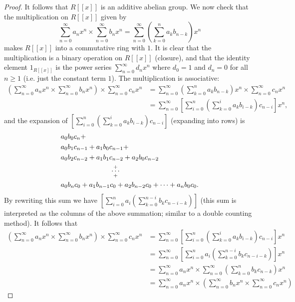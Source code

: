 \documentclass[11pt]{article}
\newcommand{\br}[1]{\left(#1\right)}
\newcommand{\sbr}[1]{\left[#1\right]}
\begin{document}
\begin{enumerate}
\begin{enumerate}
\begin{proof}
            It follows that $R[[x]]$ is an additive abelian group. 
            We now check that the multiplication on $R[[x]]$ given by \[\sum_{n=0}^\infty a_nx^n\times \sum_{n=0}^\infty b_nx^n = \sum_{n=0}^\infty\br{\sum_{k=0}^n a_kb_{n-k}}x^n\] makes $R[[x]]$ into a commutative ring with $1$. It is clear that the multiplication is a binary operation on $R[[x]]$ (closure), and that the identity element $1_{R[[x]]}$ is the power series $\sum_{n=0}^\infty d_nx^n$ where $d_0 = 1$ and $d_n = 0$ for all $n\geq 1$ (i.e. just the constant term $1$). 
            The multiplication is associative: \begin{align*}
                \br{\sum_{n=0}^\infty a_nx^n \times \sum_{n=0}^\infty b_nx^n} \times \sum_{n=0}^\infty c_nx^n &= \sum_{n=0}^\infty\br{\sum_{k=0}^n a_kb_{n-k}}x^n\times \sum_{n=0}^\infty c_nx^n \\
                &= \sum_{n=0}^{\infty}\sbr{\sum_{i=0}^n\br{\sum_{k=0}^i a_kb_{i-k}}c_{n-i}}x^n,
            \end{align*} and the expansion of $\sbr{\sum_{i=0}^n\br{\sum_{k=0}^i a_kb_{i-k}}c_{n-i}}$ (expanding into rows) is \begin{align*}
                &a_0b_0c_n +\\
                &a_0b_1c_{n-1} + a_1b_0c_{n-1} +\\
                &a_0b_2c_{n-2} + a_1b_1c_{n-2} + a_2b_0c_{n-2}  \\
                &\hspace{7.25em} \overset{+}{\underset{+}{\cdots}} \\
                &a_0b_nc_0 + a_1b_{n-1}c_0 + a_2b_{n-2}c_0 + \cdots + a_nb_0c_0.
            \end{align*}
            By rewriting this sum we have $\sbr{\sum_{i=0}^n a_i\br{\sum_{k=0}^{n-i}b_kc_{n-i-k}}}$ (this sum is interpreted as the columns of the above summation; similar to a double counting method). 
            It follows that \begin{align*}
                \br{\sum_{n=0}^\infty a_nx^n \times \sum_{n=0}^\infty b_nx^n} \times \sum_{n=0}^\infty c_nx^n &= \sum_{n=0}^{\infty}\sbr{\sum_{i=0}^n\br{\sum_{k=0}^i a_kb_{i-k}}c_{n-i}}x^n\\
                &= \sum_{n=0}^{\infty}\sbr{\sum_{i=0}^n a_i\br{\sum_{k=0}^{n-i}b_kc_{n-i-k}}}x^n\\
                &= \sum_{n=0}^\infty a_nx^n\times \sum_{n=0}^{\infty}\br{\sum_{k=0}^nb_kc_{n-k}}x^n\\
                &= \sum_{n=0}^\infty a_nx^n\times \br{\sum_{n=0}^\infty b_nx^n\times \sum_{n=0}^\infty c_nx^n}

\end{align*}
\end{proof}
\end{enumerate}
\end{enumerate}
\end{document}
